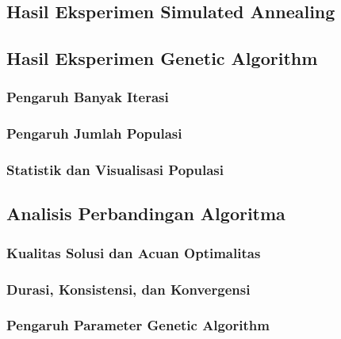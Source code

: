 \documentclass[11pt,a4paper]{article}
\begin{document}
\subsection{Hasil Eksperimen Simulated Annealing}
\par\pagebreak[0]

\subsection{Hasil Eksperimen Genetic Algorithm}
\par\pagebreak[0]

\subsubsection{Pengaruh Banyak Iterasi}
\par\pagebreak[0]

\subsubsection{Pengaruh Jumlah Populasi}
\par\pagebreak[0]

\subsubsection{Statistik dan Visualisasi Populasi}
\par\pagebreak[0]

\subsection{Analisis Perbandingan Algoritma}
\par\pagebreak[0]

\subsubsection{Kualitas Solusi dan Acuan Optimalitas}
\par\pagebreak[0]

\subsubsection{Durasi, Konsistensi, dan Konvergensi}
\par\pagebreak[0]

\subsubsection{Pengaruh Parameter Genetic Algorithm}
\par\pagebreak[0]
\end{document}
